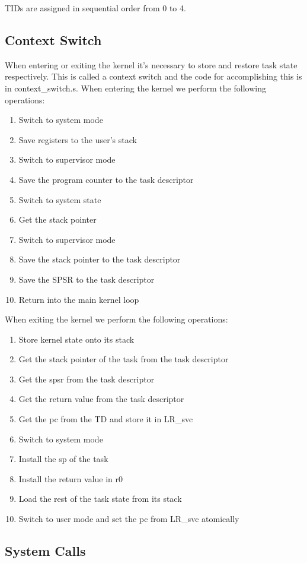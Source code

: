 \documentclass{article}
\begin{document}
TIDs are assigned in sequential order from 0 to 4.

\subsection{Context Switch}

When entering or exiting the kernel it's necessary to store and restore task state respectively. This is called a context switch and the code for accomplishing this is in context\_switch.s. When entering the kernel we perform the following operations:
\begin{enumerate}
  \item Switch to system mode
  \item Save registers to the user's stack
  \item Switch to supervisor mode
  \item Save the program counter to the task descriptor
  \item Switch to system state
  \item Get the stack pointer
  \item Switch to supervisor mode
  \item Save the stack pointer to the task descriptor
  \item Save the SPSR to the task descriptor
  \item Return into the main kernel loop
\end{enumerate}
When exiting the kernel we perform the following operations:
\begin{enumerate}
  \item Store kernel state onto its stack
  \item Get the stack pointer of the task from the task descriptor
  \item Get the spsr from the task descriptor
  \item Get the return value from the task descriptor
  \item Get the pc from the TD and store it in LR\_svc
  \item Switch to system mode
  \item Install the sp of the task
  \item Install the return value in r0
  \item Load the rest of the task state from its stack
  \item Switch to user mode and set the pc from LR\_svc atomically
\end{enumerate}

\subsection{System Calls}
\end{document}
